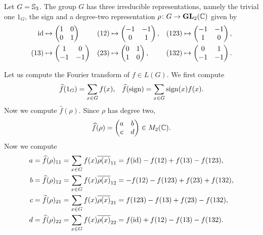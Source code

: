 \begin{example}
  Let $G=\mathbb{S}_3$. The group $G$ has three irreducible representations, namely the trivial one $1_G$, 
  the sign and a degree-two representation 
  $\rho\colon G\to\mathbf{GL}_2(\mathbb{C})$ given by 
  \begin{align*}
     \operatorname{id} &\mapsto \begin{pmatrix}
      1 & 0\\
      0 & 1
    \end{pmatrix}
    && (12)\mapsto\begin{pmatrix}
      -1 & -1\\
      0 & 1
    \end{pmatrix},
    && (123)\mapsto\begin{pmatrix}
      -1 & -1\\
      1 & 0
    \end{pmatrix},\\
    (13)&\mapsto \begin{pmatrix}
      1 & 0\\
      -1 & -1
    \end{pmatrix}
    && (23)\mapsto\begin{pmatrix}
      0 & 1\\
      1 & 0
    \end{pmatrix},
    && (132)\mapsto\begin{pmatrix}
      0 & 1\\
      -1 & -1
    \end{pmatrix}.
  \end{align*}
  
  Let us compute the Fourier transform of $f\in L(G)$.  
  We first compute 
  \begin{align*}
    \widehat{f}(1_G)=\sum_{x\in G}f(x), && \widehat{f}(\operatorname{sign})=\sum_{x\in G}\operatorname{sign}(x)f(x).
  \end{align*}
  Now we compute $\widehat{f}(\rho)$. Since $\rho$ has degree two, 
  \[ 
    \widehat{f}(\rho)=\begin{pmatrix}
      a & b\\
      c & d
    \end{pmatrix}\in M_2(\mathbb{C}).
  \]
  Now we compute 
  \begin{align*}
    a &= \widehat{f}(\rho)_{11}=\sum_{x\in G}f(x)\overline{\rho(x)}_{11}=f(\operatorname{id})-f(12)+f(13)-f(123),\\
    b &= \widehat{f}(\rho)_{12}=\sum_{x\in G}f(x)\overline{\rho(x)}_{12}=-f(12)-f(123)+f(23)+f(132),\\
    c &= \widehat{f}(\rho)_{21}=\sum_{x\in G}f(x)\overline{\rho(x)}_{21}=f(123)-f(13)+f(23)-f(132),\\
    d &= \widehat{f}(\rho)_{22}=\sum_{x\in G}f(x)\overline{\rho(x)}_{22}=f(\operatorname{id})+f(12)-f(13)-f(132).
  \end{align*}


\end{example}
